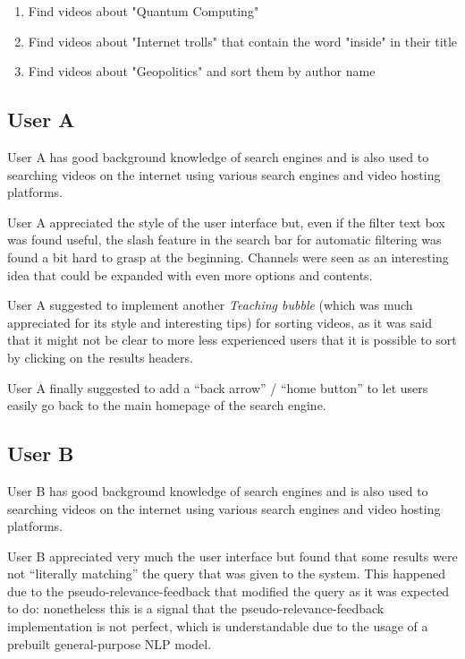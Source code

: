 \documentclass[12pt]{exam}
\begin{document}
\begin{enumerate}
\item Find videos about "Quantum Computing"
\item Find videos about "Internet trolls" that contain the word "inside" 
      in their title
\item Find videos about "Geopolitics" and sort them by author name
\end{enumerate}
\subsection{User A}

User A has good background knowledge of search engines and is also used to
searching videos on the internet using various search engines and video hosting
platforms.

User A appreciated the style of the user interface but, even if the
filter text box was found useful, the slash feature in the search bar for
automatic filtering was found a bit hard to grasp at the beginning. Channels
were seen as an interesting idea that could be expanded with even more options
and contents.

User A suggested to implement another \textit{Teaching bubble} (which was
much appreciated for its style and interesting tips) for sorting videos, as it
was said that it might not be clear to more less experienced users that it is
possible to sort by clicking on the results headers.

User A finally suggested to add a ``back arrow'' / ``home button'' to let
users easily go back to the main homepage of the search engine.

\subsection{User B}

User B has good background knowledge of search engines and is also used to
searching videos on the internet using various search engines and video hosting
platforms.

User B appreciated very much the user interface but found that some results
were not ``literally matching'' the query that was given to the system. This
happened due to the pseudo-relevance-feedback that modified the query as it was
expected to do: nonetheless this is a signal that the pseudo-relevance-feedback
implementation is not perfect, which is understandable due to the usage of a
prebuilt general-purpose NLP model.
\end{document}
